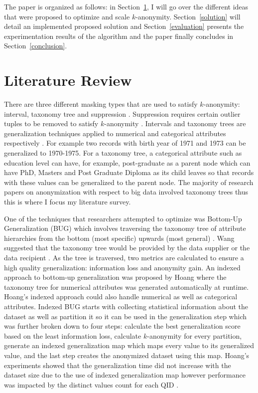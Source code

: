 \documentclass[11pt]{article}       %
\begin{document}
The paper is organized as follows: in Section~\ref{literature}, I will go over the different ideas that were proposed to optimize and scale $k$-anonymity. Section~\ref{solution} will detail an implemented proposed solution and Section~\ref{evaluation} presents the experimentation results of the algorithm and the paper finally concludes in Section~\ref{conclusion}.

\section{Literature Review} \label{literature}

There are three different masking types that are used to satisfy $k$-anonymity: interval, taxonomy tree and suppression \cite{Al-Zobbi-Mohammed:2018}. Suppression requires certain outlier tuples to be removed to satisfy $k$-anonymity \cite{Samarati-P.:1998}. Intervals and taxonomy trees are generalization techniques applied to numerical and categorical attributes respectively \cite{Samarati-P.:1998}. For example two records with birth year of 1971 and 1973 can be generalized to 1970-1975. For a taxonomy tree, a categorical attribute such as education level can have, for example, post-graduate as a parent node which can have PhD, Masters and Post Graduate Diploma as its child leaves so that records with these values can be generalized to the parent node. The majority of research papers on anonymization with respect to big data involved taxonomy trees thus this is where I focus my literature survey.

One of the techniques that researchers attempted to optimize was Bottom-Up Generalization (BUG) which involves traversing the taxonomy tree of attribute hierarchies from the bottom (most specific) upwards (most general) \cite{Ke-Wang:2004}. Wang suggested that the taxonomy tree would be provided by the data supplier or the data recipient \cite{Ke-Wang:2004}. As the tree is traversed, two metrics are calculated to ensure a high quality generalization: information loss and anonymity gain. An indexed approach to bottom-up generalization was proposed by Hoang \cite{Hoang:2012} where the taxonomy tree for numerical attributes was generated automatically at runtime. Hoang's indexed approach could also handle numerical as well as categorical attributes. Indexed BUG starts with collecting statistical information about the dataset as well as partition it so it can be used in the generalization step which was further broken down to four steps: calculate the best generalization score based on the least information loss, calculate $k$-anonymity for every partition, generate an indexed generalization map which maps every value to its generalized value, and the last step creates the anonymized dataset using this map. Hoang's experiments showed that the generalization time did not increase with the dataset size due to the use of indexed generalization map however performance was impacted by the distinct values count for each QID \cite{Hoang:2012}.
\end{document}
